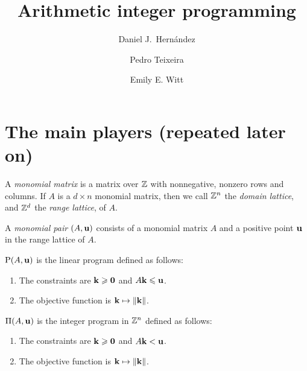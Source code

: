 \documentclass[11pt]{amsart}
\begin{document}
\title[Arithmetic programming and Frobenius powers]{Arithmetic integer programming
}
\author{Daniel J.\ Hern\'andez}
\author{Pedro Teixeira}
\author{Emily E. Witt}
\maketitle


\section{The main players (repeated later on)}

\begin{definition}
A \emph{monomial matrix} is a matrix over $\mathbb{Z}$ with nonnegative, nonzero rows and columns.   If $A$ is a $d \times n$ monomial matrix, then we call $\mathbb{Z}^n$ the \emph{domain lattice}, and $\mathbb{Z}^d$ the \emph{range lattice}, of $A$.
\end{definition}

\begin{definition}
A \emph{monomial pair} $(A, \mathbf{u})$ consists of a monomial matrix $A$ and a positive point $\mathbf{u}$ in the range lattice of $A$.
\end{definition}




\begin{definition}
$\mathrm{P}(A, \mathbf{u})$ is the linear program defined as follows:
\begin{enumerate}
\item The constraints are $\mathbf{k} \geqslant \mathbf{0}$ and $A \mathbf{k} \leqslant \mathbf{u}$.
\item The objective function is $\mathbf{k} \mapsto \| \mathbf{k} \|$.
\end{enumerate}
\end{definition}



\begin{definition}
$\Pi(A, \mathbf{u})$ is the integer program in $\mathbb{Z}^n$ defined as follows:
\begin{enumerate}
\item The constraints are $\mathbf{k} \geqslant \mathbf{0}$ and $A \mathbf{k} < \mathbf{u}$. 
\item The objective function is $\mathbf{k} \mapsto \| \mathbf{k} \|$.
\end{enumerate}
\end{definition}
\end{document}
